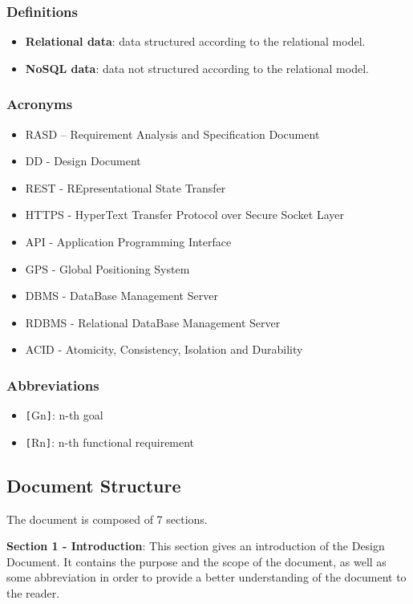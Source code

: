 \subsubsection{Definitions}
\begin{itemize}
\item \textbf{Relational data}: data structured according to the relational model.
\item \textbf{NoSQL data}: data not structured according to the relational model.
\end{itemize}
\subsubsection{Acronyms}
\begin{itemize}
\item RASD – Requirement Analysis and Specification Document
\item DD - Design Document
\item REST - REpresentational State Transfer
\item HTTPS - HyperText Transfer Protocol over Secure Socket Layer
\item API - Application Programming Interface
\item GPS - Global Positioning System
\item DBMS - DataBase Management Server
\item RDBMS - Relational DataBase Management Server
\item ACID - Atomicity, Consistency, Isolation and Durability
\end{itemize}
\subsubsection{Abbreviations}
\begin{itemize}
\item \verb|[|Gn\verb|]|: n-th goal
\item \verb|[|Rn\verb|]|: n-th functional requirement
\end{itemize}

\subsection{Document Structure}
The document is composed of 7 sections.\newline

\textbf{Section 1 - Introduction}: This section gives an introduction of the Design Document. It contains the purpose and the scope of the document, as well as some abbreviation in order to provide a better understanding of the document to the reader.\newline

